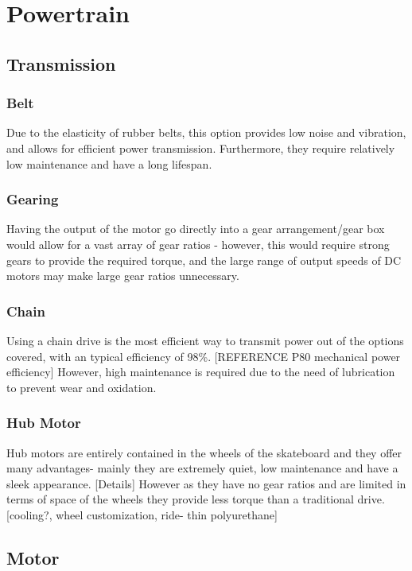 \documentclass[journal,10pt]{IEEEtran}
\begin{document}
\section{Powertrain}
    \subsection{Transmission}
        \subsubsection{Belt}
            Due to the elasticity of rubber belts, this option provides low noise and vibration, and allows for efficient power transmission. Furthermore, they require relatively low maintenance and have a long lifespan. 
        \subsubsection{Gearing}
            Having the output of the motor go directly into a gear arrangement/gear box would allow for a vast array of gear ratios - however, this would require strong gears to provide the required torque, and the large range of output speeds of DC motors may make large gear ratios unnecessary.
        \subsubsection{Chain}
            Using a chain drive is the most efficient way to transmit power out of the options covered, with an typical efficiency of 98\%. [REFERENCE P80 mechanical power efficiency] However, high maintenance is required due to the need of lubrication to prevent wear and oxidation. 
        \subsubsection{Hub Motor}
            Hub motors are entirely contained in the wheels of the skateboard and they offer many advantages- mainly they are extremely quiet, low maintenance and have a sleek appearance. [Details]
            However as they have no gear ratios and are limited in terms of space of the wheels they provide less torque than a traditional drive. [cooling?, wheel customization, ride- thin polyurethane]
    \subsection{Motor}
\end{document}
